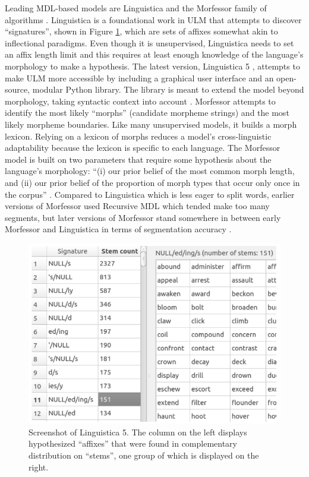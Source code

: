 \documentclass[12pt]{article}
\begin{document}
Leading MDL-based models are Linguistica \cite{goldsmith_linguistica:_2000,goldsmith_unsupervised_2001} and the Morfessor family of algorithms \cite{creutz_unsupervised_2005a,creutz_unsupervised_2007}. Linguistica is a foundational work in ULM that attempts to discover “signatures”, shown in Figure \ref{fig:signatures}, which are sets of affixes somewhat akin to inflectional paradigms. Even though it is unsupervised, Linguistica needs to set an affix length limit and this requires at least enough knowledge of the language’s morphology to make a hypothesis. The latest version, Linguistica 5 \cite{lee_linguistica_2016}, attempts to make ULM more accessible by including a graphical user interface and an open-source, modular Python library. The library is meant to extend the model beyond morphology, taking syntactic context into account \cite{nicolai_morphological_2017}. Morfessor \cite{creutz_unsupervised_2005a,creutz_inducing_2005b,creutz_unsupervised_2007} attempts to identify the most likely ``morphs'' (candidate morpheme strings) and the most likely morpheme boundaries. Like many unsupervised models, it builds a morph lexicon. Relying on a lexicon of morphs reduces a model's cross-linguistic adaptability because the lexicon is specific to each language. The Morfessor model is built on two parameters that require some hypothesis about the language's morphology: ``(i) our prior belief of the most common morph length, and (ii) our prior belief of the proportion of morph types that occur only once in the corpus'' \cite[page 281]{creutz_unsupervised_2003}. Compared to Linguistica which is less eager to split words, earlier versions of Morfessor used Recursive MDL which tended make too many segments, but later versions of Morfessor stand somewhere in between early Morfessor and Linguistica in terms of segmentation accuracy \cite{creutz_unsupervised_2003}. 

\begin{figure}[ht]
\begin{center}
\includegraphics[width=0.5\columnwidth]{Linguistica5-signatures.PNG}
\caption{Screenshot of Linguistica 5. The column on the left displays hypothesized ``affixes'' that were found in complementary distribution on ``stems'', one group of which is displayed on the right.}
\label{fig:signatures}
\end{center}
\end{figure}
\end{document}
